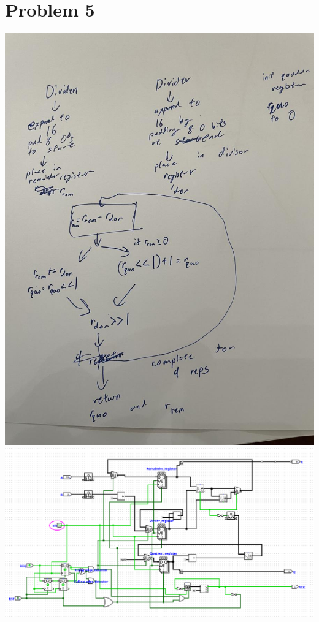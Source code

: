 \documentclass[12pt]{article}
\begin{document}
\section*{Problem 5}
\includegraphics[scale=0.2]{Fig1.jpg}\\
\includegraphics[scale=0.2]{Problem5.png}
\end{document}
